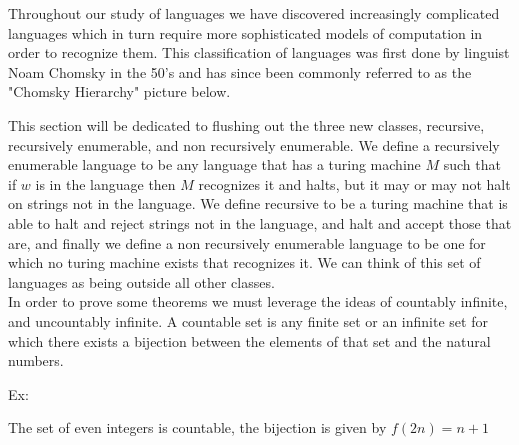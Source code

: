 \documentclass[11pt]{exam}
\begin{document}
Throughout our study of languages we have discovered increasingly complicated languages
which in turn require more sophisticated models of computation in order to recognize them.
This classification of languages was first done by linguist Noam Chomsky in the 50's and has since been commonly referred to as the "Chomsky Hierarchy" picture below.\\
\begin{center}
\end{center}


This section will be dedicated to flushing out the three new classes, recursive, recursively enumerable, and non recursively enumerable. We define a recursively enumerable language to be any language that has a turing machine $M$ such that if $w$ is in the language then $M$ recognizes it and halts, but it may or may not halt on strings not in the language. We define recursive to be a turing machine that is able to halt and reject strings not in the language, and halt and accept those that are, and finally we define a non recursively enumerable language to be one for which no turing machine exists that recognizes it. We can think of this set of languages as being outside all other classes.\\

In order to prove some theorems we must leverage the ideas of countably infinite, and uncountably infinite. A countable set is any finite set or an infinite set for which there exists a bijection between the elements of that set and the natural numbers.

Ex:
\begin{center}
The set of even integers is countable, the bijection is given by $f(2n) = n + 1$ 
\end{center} 
\end{document}
